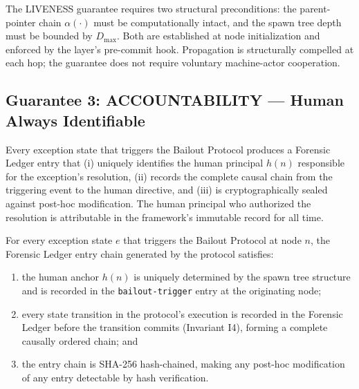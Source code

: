 The LIVENESS guarantee requires two structural preconditions: the parent-pointer
chain $\alpha(\cdot)$ must be computationally intact, and the spawn tree depth
must be bounded by $D_{\max}$.  Both are established at node initialization and
enforced by the \fact{} layer's pre-commit hook.  Propagation is structurally
compelled at each hop; the guarantee does not require voluntary machine-actor
cooperation.

\subsection{Guarantee 3: ACCOUNTABILITY --- Human Always Identifiable}
\label{sec:guarantee-accountability}

\begin{definition}
\label{def:accountability}
Every exception state that triggers the Bailout Protocol produces a Forensic
Ledger entry that (i) uniquely identifies the human principal $h(n)$ responsible
for the exception's resolution, (ii) records the complete causal chain from the
triggering event to the human directive, and (iii) is cryptographically sealed
against post-hoc modification.  The human principal who authorized the
resolution is attributable in the framework's immutable record for all time.
\end{definition}

\begin{maintheorem}[ACCOUNTABILITY]
\label{th:accountability}
For every exception state $e$ that triggers the Bailout Protocol at node $n$,
the Forensic Ledger entry chain generated by the protocol satisfies:
\begin{enumerate}
\item[(i)] the human anchor $h(n)$ is uniquely determined by the spawn tree
structure and is recorded in the \texttt{bailout-trigger} entry at the
originating node;
\item[(ii)] every state transition in the protocol's execution is recorded in
the Forensic Ledger before the transition commits (Invariant I4), forming a
complete causally ordered chain; and
\item[(iii)] the entry chain is SHA-256 hash-chained, making any post-hoc
modification of any entry detectable by hash verification.
\end{enumerate}
\end{maintheorem}

